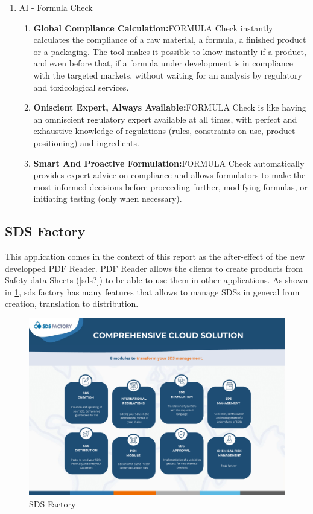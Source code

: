 \documentclass[a4paper,12pt,twoside]{report}
\begin{document}
\begin{enumerate}
\begin{enumerate}
\begin{itemize}
	\end{itemize}	
	\end{enumerate}
\item AI - Formula Check
	\begin{enumerate}
		\item \textbf{Global Compliance Calculation:}FORMULA Check instantly calculates the compliance of a raw 
material, a formula, a finished product or a packaging. The tool 
makes it possible to know instantly if a product, and even before that, if 
a formula under development is in compliance with the targeted 
markets, without waiting for an analysis by regulatory and toxicological 
services.
		\item \textbf{Oniscient Expert, Always Available:}FORMULA Check is like having an omniscient regulatory expert 
available at all times, with perfect and exhaustive knowledge of 
regulations (rules, constraints on use, product positioning) and 
ingredients.

		\item \textbf{Smart And Proactive Formulation:}FORMULA Check automatically provides expert advice on 
compliance and allows formulators to make the most informed 
decisions before proceeding further, modifying formulas, or initiating 
testing (only when necessary).
	\end{enumerate}
\end{enumerate}



\subsection{SDS Factory}
This application comes in the context of this report as the after-effect of the new developped PDF Reader. PDF Reader allows the clients to create products from Safety data Sheets (\ref{sds?}) to be able to use them in other applications. As shown in \ref{sdsfactory}, sds factory has many features that allows to manage SDSs in general from creation, translation to distribution.
\begin{figure}[H]
		\includegraphics[width=\textwidth]{images/sdsFactory}
	\caption[SDS Factory]{SDS Factory}
	\label{sdsfactory}
\end{figure}
\end{document}
